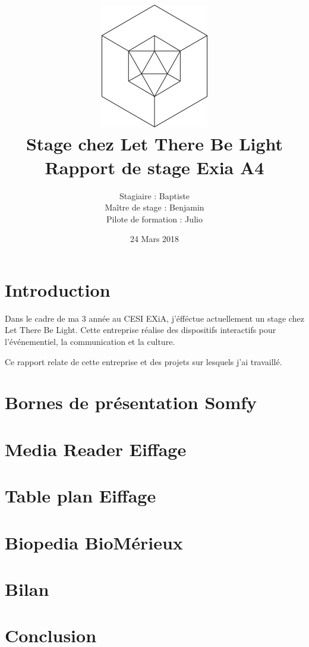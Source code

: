 \documentclass{article}
\title{\includegraphics{img/logo.png}\vspace{2cm}\\
    Stage chez Let There Be Light \\
    \large Rapport de stage Exia A4}
\date{24 Mars 2018}
\author{Stagiaire : Baptiste \bsc{Saclier} \\
    Maître de stage : Benjamin \bsc{Petit}\\
    Pilote de formation : Julio \bsc{Santilario}}
\begin{document}
    \maketitle

    \clearpage

    \tableofcontents

    \section{Introduction}

    Dans le cadre de ma 3 année au CESI EXiA, j'éfféctue actuellement un stage chez Let There Be Light.
    Cette entreprise réalise des dispositifs interactifs pour l'événementiel, la communication et la culture.

    Ce rapport relate de cette entreprise et des projets sur lesquels j'ai travaillé.

    \clearpage

    

    

    

    \section{Bornes de présentation Somfy}

    \section{Media Reader Eiffage}

    \section{Table plan Eiffage}

    \section{Biopedia BioMérieux}

    \section{Bilan}

    \section{Conclusion}
\end{document}
